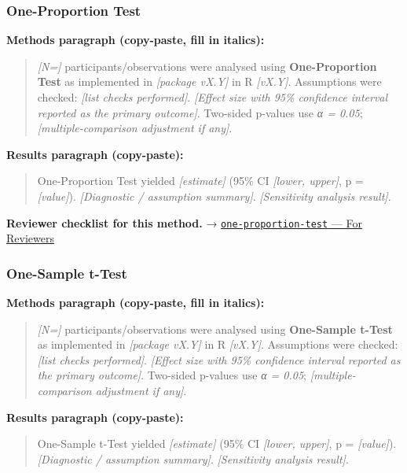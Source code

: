 \documentclass[
]{article}
\begin{document}
\subsubsection{One-Proportion Test}\label{one-proportion-test}

\textbf{Methods paragraph (copy-paste, fill in italics):}

\begin{quote}
\emph{{[}N={]}} participants/observations were analysed using
\textbf{One-Proportion Test} as implemented in \emph{{[}package vX.Y{]}}
in R \emph{{[}vX.Y{]}}. Assumptions were checked: \emph{{[}list checks
performed{]}}. \emph{{[}Effect size with 95\% confidence interval
reported as the primary outcome{]}}. Two-sided p-values use \emph{α =
0.05}; \emph{{[}multiple-comparison adjustment if any{]}}.
\end{quote}

\textbf{Results paragraph (copy-paste):}

\begin{quote}
One-Proportion Test yielded \emph{{[}estimate{]}} (95\% CI
\emph{{[}lower, upper{]}}, p = \emph{{[}value{]}}). \emph{{[}Diagnostic
/ assumption summary{]}}. \emph{{[}Sensitivity analysis result{]}}.
\end{quote}

\textbf{Reviewer checklist for this method.} →
\href{../chapters/04-inferential/one-proportion-test.Rmd\#for-reviewers}{\texttt{one-proportion-test}
--- For Reviewers}

\subsubsection{One-Sample t-Test}\label{one-sample-t-test}

\textbf{Methods paragraph (copy-paste, fill in italics):}

\begin{quote}
\emph{{[}N={]}} participants/observations were analysed using
\textbf{One-Sample t-Test} as implemented in \emph{{[}package vX.Y{]}}
in R \emph{{[}vX.Y{]}}. Assumptions were checked: \emph{{[}list checks
performed{]}}. \emph{{[}Effect size with 95\% confidence interval
reported as the primary outcome{]}}. Two-sided p-values use \emph{α =
0.05}; \emph{{[}multiple-comparison adjustment if any{]}}.
\end{quote}

\textbf{Results paragraph (copy-paste):}

\begin{quote}
One-Sample t-Test yielded \emph{{[}estimate{]}} (95\% CI \emph{{[}lower,
upper{]}}, p = \emph{{[}value{]}}). \emph{{[}Diagnostic / assumption
summary{]}}. \emph{{[}Sensitivity analysis result{]}}.
\end{quote}
\end{document}
